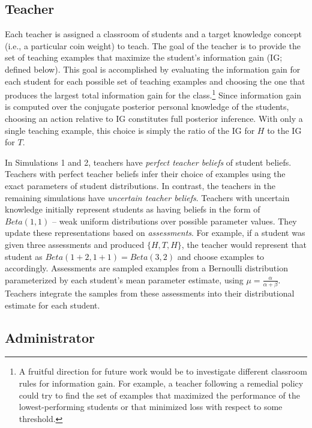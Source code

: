 \documentclass[10pt, letterpaper]{article}
\begin{document}
\subsection{Teacher}\label{teacher}

Each teacher is assigned a classroom of students and a target knowledge
concept (i.e., a particular coin weight) to teach. The goal of the
teacher is to provide the set of teaching examples that maximize the
student's information gain (IG; defined below). This goal is
accomplished by evaluating the information gain for each student for
each possible set of teaching examples and choosing the one that
produces the largest total information gain for the class.\footnote{A
  fruitful direction for future work would be to investigate different
  classroom rules for information gain. For example, a teacher following
  a remedial policy could try to find the set of examples that maximized
  the performance of the lowest-performing students or that minimized
  loss with respect to some threshold.} Since information gain is
computed over the conjugate posterior personal knowledge of the
students, choosing an action relative to IG constitutes full posterior
inference. With only a single teaching example, this choice is simply
the ratio of the IG for \(H\) to the IG for \(T\).

In Simulations 1 and 2, teachers have \emph{perfect teacher beliefs} of
student beliefs. Teachers with perfect teacher beliefs infer their
choice of examples using the exact parameters of student distributions.
In contrast, the teachers in the remaining simulations have
\emph{uncertain teacher beliefs}. Teachers with uncertain knowledge
initially represent students as having beliefs in the form of
\(Beta(1,1)\) -- weak uniform distributions over possible parameter
values. They update these representations based on \emph{assessments}.
For example, if a student was given three assessments and produced
\(\{H, T, H\}\), the teacher would represent that student as
\(Beta(1+2,1+1) = Beta(3,2)\) and choose examples to accordingly.
Assessments are sampled examples from a Bernoulli distribution
parameterized by each student's mean parameter estimate, using
\(\mu = \frac{\alpha}{\alpha + \beta}\). Teachers integrate the samples
from these assessments into their distributional estimate for each
student.

\subsection{Administrator}\label{administrator}
\end{document}
